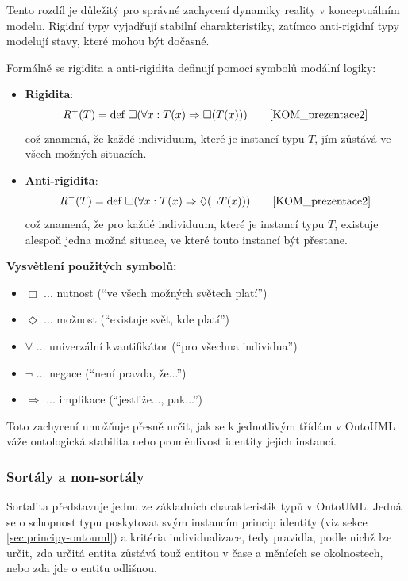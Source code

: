 Tento rozdíl je důležitý pro správné zachycení dynamiky reality v konceptuálním modelu. Rigidní typy vyjadřují stabilní charakteristiky, zatímco anti-rigidní typy modelují stavy, které mohou být dočasné.

Formálně se rigidita a anti-rigidita definují pomocí symbolů modální logiky:

\begin{itemize}
  \item \textbf{Rigidita}:
    \[
      R^+(T) = \text{def} \ \Box(\forall x : T(x) \Rightarrow \Box(T(x))) \tag*{\cite{KOM_prezentace2}}
    \]
    což znamená, že každé individuum, které je instancí typu \(T\), jím zůstává ve všech možných situacích.

  \item \textbf{Anti-rigidita}:
    \[
      R^-(T) = \text{def} \ \Box(\forall x : T(x) \Rightarrow \Diamond (\neg T(x))) \tag*{\cite{KOM_prezentace2}}
    \]
    což znamená, že pro každé individuum, které je instancí typu \(T\), existuje alespoň jedna možná situace, ve které touto instancí být přestane.
\end{itemize}

\noindent
\textbf{Vysvětlení použitých symbolů:}
\begin{itemize}
  \item \(\Box\) ... nutnost (``ve všech možných světech platí'')
  \item \(\Diamond\) ... možnost (``existuje svět, kde platí'')
  \item \(\forall\) ... univerzální kvantifikátor (``pro všechna individua'')
  \item \(\neg\) ... negace (``není pravda, že...'')
  \item \(\Rightarrow\) ... implikace (``jestliže..., pak...'') \cite{KOM_prezentace2}
\end{itemize}

\noindent Toto zachycení umožňuje přesně určit, jak se k jednotlivým třídám v OntoUML váže ontologická stabilita nebo proměnlivost identity jejich instancí.


\subsubsection{Sortály a non-sortály}
\label{sec:ontouml-sortalita}
Sortalita představuje jednu ze základních charakteristik typů v OntoUML. Jedná se o schopnost typu poskytovat svým instancím princip identity (viz sekce \ref{sec:principy-ontouml}) a kritéria individualizace, tedy pravidla, podle nichž lze určit, zda určitá entita zůstává touž entitou v čase a měnících se okolnostech, nebo zda jde o entitu odlišnou.

